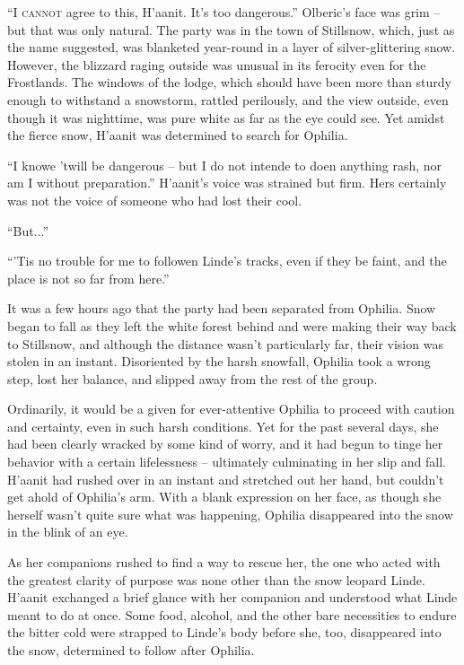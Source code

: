 \textsc{``I cannot} agree to this, H'aanit. It's too dangerous.'' Olberic's face was grim -- but that was only natural. The party was in the town of Stillsnow, which, just as the name suggested, was blanketed year-round in a layer of silver-glittering snow. However, the blizzard raging outside was unusual in its ferocity even for the Frostlands. The windows of the lodge, which should have been more than sturdy enough to withstand a snowstorm, rattled perilously, and the view outside, even though it was nighttime, was pure white as far as the eye could see. Yet amidst the fierce snow, H'aanit was determined to search for Ophilia.

``I knowe 'twill be dangerous -- but I do not intende to doen anything rash, nor am I without preparation.'' H'aanit's voice was strained but firm. Hers certainly was not the voice of someone who had lost their cool.

``But...''

``'Tis no trouble for me to followen Linde's tracks, even if they be faint, and the place is not so far from here.''

It was a few hours ago that the party had been separated from Ophilia. Snow began to fall as they left the white forest behind and were making their way back to Stillsnow, and although the distance wasn't particularly far, their vision was stolen in an instant. Disoriented by the harsh snowfall, Ophilia took a wrong step, lost her balance, and slipped away from the rest of the group.

Ordinarily, it would be a given for ever-attentive Ophilia to proceed with caution and certainty, even in such harsh conditions. Yet for the past several days, she had been clearly wracked by some kind of worry, and it had begun to tinge her behavior with a certain lifelessness -- ultimately culminating in her slip and fall. H'aanit had rushed over in an instant and stretched out her hand, but couldn't get ahold of Ophilia's arm. With a blank expression on her face, as though she herself wasn't quite sure what was happening, Ophilia disappeared into the snow in the blink of an eye.

As her companions rushed to find a way to rescue her, the one who acted with the greatest clarity of purpose was none other than the snow leopard Linde. H'aanit exchanged a brief glance with her companion and understood what Linde meant to do at once. Some food, alcohol, and the other bare necessities to endure the bitter cold were strapped to Linde's body before she, too, disappeared into the snow, determined to follow after Ophilia.

